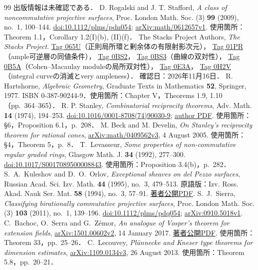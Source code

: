 \documentclass[11pt,a4paper]{ltjsarticle}
\begin{document}
\begin{thebibliography}{99}
出版情報は未確認である．
 D. Rogalski and J. T. Stafford,
\emph{A class of noncommutative projective surfaces},
Proc. London Math. Soc. (3) \textbf{99} (2009), no.~1, 100--144.
\href{https://doi.org/10.1112/plms/pdn054}{doi:10.1112/plms/pdn054};
\href{https://arxiv.org/abs/math/0612657}{arXiv:math/0612657v1}.
使用箇所：Theorem 1.1，Corollary 1.2(I)(b), (II)(f)．
 The Stacks Project Authors, \emph{The Stacks Project}.
\href{https://stacks.math.columbia.edu/tag/065U}{Tag 065U}（正則局所環と剰余体の有限射影次元），
\href{https://stacks.math.columbia.edu/tag/01PR}{Tag 01PR}（ample可逆層の同値条件），
\href{https://stacks.math.columbia.edu/tag/0BS2}{Tag 0BS2}，
\href{https://stacks.math.columbia.edu/tag/0BS3}{Tag 0BS3}（曲線の双対性），
\href{https://stacks.math.columbia.edu/tag/0B5A}{Tag 0B5A}（Cohen--Macaulay moduleの局所双対性），
\href{https://stacks.math.columbia.edu/tag/0E3A}{Tag 0E3A}，
\href{https://stacks.math.columbia.edu/tag/0H2V}{Tag 0H2V}（integral curveの消滅とvery ampleness）．
確認日：2026年11月16日．
 R. Hartshorne, \emph{Algebraic Geometry},
Graduate Texts in Mathematics \textbf{52}, Springer, 1977.
ISBN 0-387-90244-9．使用箇所：Chapter V，Theorems 1.9, 1.10（pp.~364--365）．
 R. P. Stanley,
\emph{Combinatorial reciprocity theorems}, Adv. Math. \textbf{14} (1974), 194--253.
\href{https://doi.org/10.1016/0001-8708(74)90030-9}{doi:10.1016/0001-8708(74)90030-9};
\href{https://math.mit.edu/~rstan/pubs/pubfiles/22.pdf}{author PDF}.
使用箇所：\S6，Proposition 6.1，p.~208．
 M. Beck and M. Develin,
\emph{On Stanley's reciprocity theorem for rational cones},
\href{https://arxiv.org/abs/math/0409562v3}{arXiv:math/0409562v3}, 4 August 2005.
使用箇所：\S4，Theorem 5，p.~8．
 T.~Levasseur,
\emph{Some properties of non-commutative regular graded rings},
Glasgow Math. J. \textbf{34} (1992), 277--300.
\href{https://doi.org/10.1017/S0017089500008843}{doi:10.1017/S0017089500008843}.
使用箇所：Proposition 3.4(b)，p.~282．
 S.~A.~Kuleshov and D.~O.~Orlov,
\emph{Exceptional sheaves on del Pezzo surfaces},
Russian Acad. Sci. Izv. Math. \textbf{44} (1995), no.~3, 479--513.
原語版：Izv. Ross. Akad. Nauk Ser. Mat. \textbf{58} (1994), no.~3, 57--91.
\href{https://homepage.mi-ras.ru/~orlov/papers/1994_Izv_Math.pdf}{著者公開PDF}.
 S.~J.~Sierra,
\emph{Classifying birationally commutative projective surfaces},
Proc. London Math. Soc. (3) \textbf{103} (2011), no.~1, 139--196.
\href{https://doi.org/10.1112/plms/pdq054}{doi:10.1112/plms/pdq054};
\href{https://arxiv.org/abs/0910.5018v1}{arXiv:0910.5018v1}.
 C.~Bachoc, O.~Serra and G.~Z\'emor,
\emph{An analogue of Vosper's theorem for extension fields},
\href{https://arxiv.org/abs/1501.00602v2}{arXiv:1501.00602v2}, 14 January 2017.
\href{https://www.math.u-bordeaux.fr/~cbachocb/articles/Vosper.pdf}{著者公開PDF}.
使用箇所：Theorem 33，pp.~25--26．
 C.~Lecouvey,
\emph{Pl\"unnecke and Kneser type theorems for dimension estimates},
\href{https://arxiv.org/abs/1109.0134v3}{arXiv:1109.0134v3}, 26 August 2013.
使用箇所：Theorem 5.8，pp.~20--21．


\end{thebibliography}
\end{document}
